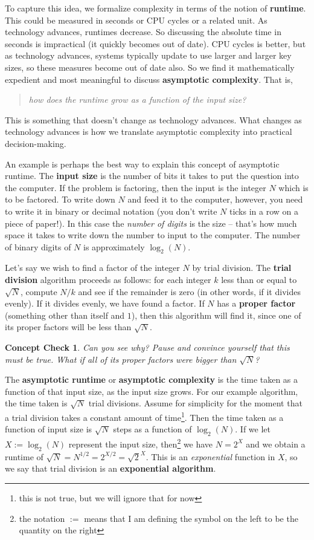\documentclass{article}
\theoremstyle{plain}
\newtheorem{checkin}[theorem]{Concept Check}
\theoremstyle{definition}
\theoremstyle{remark}
\numberwithin{theorem}{section}
\begin{document}
To capture this idea, we formalize complexity in terms of the notion of \textbf{runtime}.  This could be measured in seconds or CPU cycles or a related unit.  As technology advances, runtimes decrease.  So discussing the absolute time in seconds is impractical (it quickly becomes out of date).  CPU cycles is better, but as technology advances, systems typically update to use larger and larger key sizes, so these measures become out of date also.  So we find it mathematically expedient and most meaningful to discuss \textbf{asymptotic complexity}.  That is,
\begin{quote}
\emph{how does the runtime grow as a function of the input size?}
\end{quote}
This is something that doesn't change as technology advances.  What changes as technology advances is how we translate asymptotic complexity into practical decision-making.

An example is perhaps the best way to explain this concept of asymptotic runtime.  The \textbf{input size} is the number of bits it takes to put the question into the computer.  If the problem is factoring, then the input is the integer $N$ which is to be factored.  To write down $N$ and feed it to the computer, however, you need to write it in binary or decimal notation (you don't write $N$ ticks in a row on a piece of paper!).  In this case the \emph{number of digits} is the size -- that's how much space it takes to write down the number to input to the computer.  The number of binary digits of $N$ is approximately $\log_{2}(N)$.

Let's say we wish to find a factor of the integer $N$ by trial division.  The \textbf{trial division} algorithm proceeds as follows:  for each integer $k$ less than or equal to $\sqrt{N}$, compute $N/k$ and see if the remainder is zero (in other words, if it divides evenly).  If it divides evenly, we have found a factor.  If $N$ has a \textbf{proper factor} (something other than itself and $1$), then this algorithm will find it, since one of its proper factors will be less than $\sqrt{N}$.

\begin{checkin}
  Can you see why?  Pause and convince yourself that this must be true.  What if all of its proper factors were bigger than $\sqrt{N}$? 
\end{checkin}

The \textbf{asymptotic runtime} or \textbf{asymptotic complexity} is the time taken as a function of that input size, as the input size grows.  For our example algorithm, the time taken is $\sqrt{N}$ trial divisions.  Assume for simplicity for the moment that a trial division takes a constant amount of time\footnote{this is not true, but we will ignore that for now}.  Then the time taken as a function of input size is $\sqrt{N}$ steps as a function of $\log_2(N)$.  If we let $X := \log_2(N)$ represent the input size, then\footnote{the notation $:=$ means that I am defining the symbol on the left to be the quantity on the right} we have $N = 2^X$ and we obtain a runtime of $\sqrt{N} = N^{1/2} = 2^{X/2} = \sqrt{2}^X$.  This is an \emph{exponential} function in $X$, so we say that trial division is an \textbf{exponential algorithm}.
\end{document}
